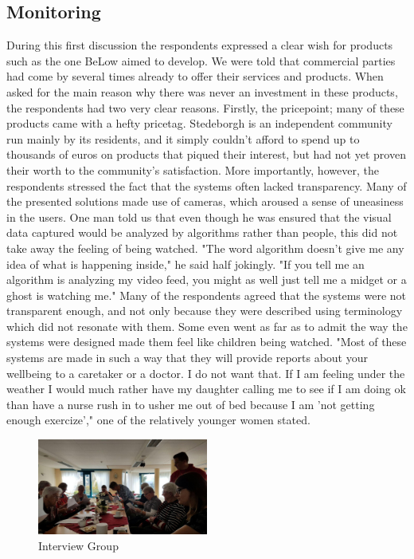 \documentclass{below-ext}
\begin{document}
\subsection{Monitoring}
During this first discussion the respondents expressed a clear wish for products such as the one BeLow aimed to develop. We were told that commercial parties had come by several times already to offer their services and products. When asked for the main reason why there was never an investment in these products, the respondents had two very clear reasons. Firstly, the pricepoint; many of these products came with a hefty pricetag. Stedeborgh is an independent community run mainly by its residents, and it simply couldn't afford to spend up to thousands of euros on products that piqued their interest, but had not yet proven their worth to the community's satisfaction. More importantly, however, the respondents stressed the fact that the systems often lacked transparency. Many of the presented solutions made use of cameras, which aroused a sense of uneasiness in the users. One man told us that even though he was ensured that the visual data captured would be analyzed by algorithms rather than people, this did not take away the feeling of being watched. "The word algorithm doesn't give me any idea of what is happening inside," he said half jokingly. "If you tell me an algorithm is analyzing my video feed, you might as well just tell me a midget or a ghost is watching me." Many of the respondents agreed that the systems were not transparent enough, and not only because they were described using terminology which did not resonate with them. Some even went as far as to admit the way the systems were designed made them feel like children being watched. "Most of these systems are made in such a way that they will provide reports about your wellbeing to a caretaker or a doctor. I do not want that. If I am feeling under the weather I would much rather have my daughter calling me to see if I am doing ok than have a nurse rush in to usher me out of bed because I am 'not getting enough exercize'," one of the relatively younger women stated. 

\begin{figure}
\center
\label{fig2:interview}
\includegraphics[width=0.5\textwidth]{interview}
\caption{Interview Group}
\end{figure}
\end{document}
